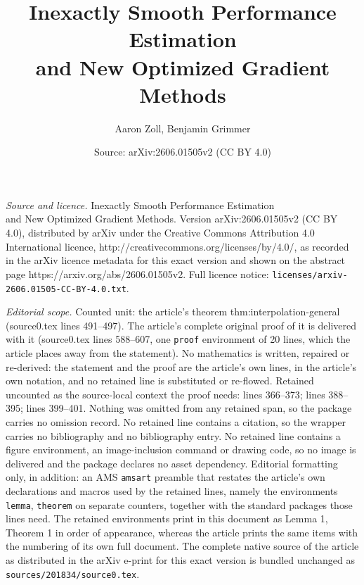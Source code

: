 \documentclass[10pt,a4paper]{amsart}
\title{Inexactly Smooth Performance Estimation\\ and New Optimized Gradient Methods}
\author{Aaron Zoll, Benjamin Grimmer}
\date{Source: arXiv:2606.01505v2 (CC BY 4.0)}
\begin{document}
\maketitle

\noindent\emph{Source and licence.} Inexactly Smooth Performance Estimation\\ and New Optimized Gradient Methods. Version arXiv:2606.01505v2 (CC BY 4.0), distributed by arXiv under the Creative Commons Attribution 4.0 International licence, http://creativecommons.org/licenses/by/4.0/, as recorded in the arXiv licence metadata for this exact version and shown on the abstract page https://arxiv.org/abs/2606.01505v2. Full licence notice: \texttt{licenses/arxiv-2606.01505-CC-BY-4.0.txt}.\par\smallskip

\noindent\textit{Editorial scope.} Counted unit: the article's theorem thm:interpolation-general (source0.tex lines 491--497). The article's complete original proof of it is delivered with it (source0.tex lines 588--607, one \texttt{proof} environment of 20 lines, which the article places away from the statement). No mathematics is written, repaired or re-derived: the statement and the proof are the article's own lines, in the article's own notation, and no retained line is substituted or re-flowed.  Retained uncounted as the source-local context the proof needs: lines 366--373; lines 388--395; lines 399--401.  Nothing was omitted from any retained span, so the package carries no omission record.  No retained line contains a citation, so the wrapper carries no bibliography and no bibliography entry.  No retained line contains a figure environment, an image-inclusion command or drawing code, so no image is delivered and the package declares no asset dependency.  Editorial formatting only, in addition: an AMS \texttt{amsart} preamble that restates the article's own declarations and macros used by the retained lines, namely the environments \texttt{lemma}, \texttt{theorem} on separate counters, together with the standard packages those lines need.  The retained environments print in this document as Lemma 1, Theorem 1 in order of appearance, whereas the article prints the same items with the numbering of its own full document.  The complete native source of the article as distributed in the arXiv e-print for this exact version is bundled unchanged as \texttt{sources/201834/source0.tex}.
\end{document}
